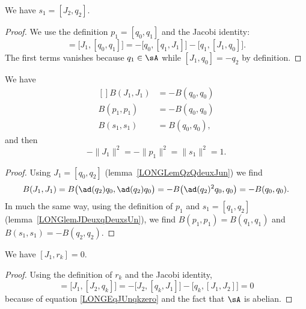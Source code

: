 \begin{lemma}				 \label{LONGlemJDeuxqDeuxsUn}
	We have $s_1=[J_2,q_2]$.
\end{lemma}

\begin{proof}
	We use the definition $p_1=[q_0,q_1]$ and the Jacobi identity:
	\begin{equation}
		[J_1,p_1]=\big[ J_1,[q_0,q_1] \big]=-\big[ q_0,[q_1,J_1] \big]-\big[ q_1,[J_1,q_0] \big].
	\end{equation}
	The first terms vanishes because $q_1\in\sA$ while $[J_1,q_0]=-q_2$ by definition.
\end{proof}

\begin{proposition}		\label{LONGPropBJpsun}
	We have
	\begin{equation}
		\begin{aligned}[]
			B(J_1,J_1) & =-B(q_0,q_0) \\
			B(p_1,p_1) & =-B(q_0,q_0) \\
			B(s_1,s_1) & =B(q_0,q_0),
		\end{aligned}
	\end{equation}
	and then
	\begin{equation}
		-\| J_1 \|^2=-\| p_1 \|^2=\| s_1 \|^2=1.
	\end{equation}
\end{proposition}

\begin{proof}
	Using $J_1=[q_0,q_2]$ (lemma~\ref{LONGLemQzQdeuxJun}) we find
	\begin{equation}
		B(J_1,J_1)=B\big( \ad(q_2)q_0,\ad(q_2)q_0 \big)=-B\big( \ad(q_2)^2q_0,q_0 \big)=-B(q_0,q_0).
	\end{equation}
	In much the same way, using the definition of $p_1$ and $s_1=[q_1,q_2]$ (lemma~\ref{LONGlemJDeuxqDeuxsUn}), we find $B(p_1,p_1)=B(q_1,q_1)$ and $B(s_1,s_1)=-B(q_2,q_2)$.

\end{proof}

\begin{lemma}		\label{LONGLemJunrkzero}
	We have $[J_1,r_k]=0$.
\end{lemma}

\begin{proof}
	Using the definition of $r_k$ and the Jacobi identity,
	\begin{equation}
		[J_1,r_k]= \big[ J_1,[J_2,q_k] \big]=-\big[ J_2,[q_k,J_1] \big]-\big[ q_k,[J_1,J_2] \big]=0
	\end{equation}
	because of equation \eqref{LONGEqJUnqkzero} and the fact that $\sA$ is abelian.
\end{proof}

